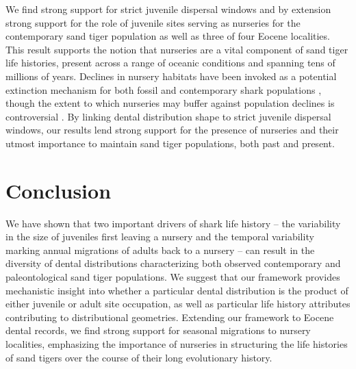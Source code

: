 \documentclass[]{rsos}%
\begin{document}
We find strong support for strict juvenile dispersal windows and by extension strong support for the role of juvenile sites serving as nurseries for the contemporary sand tiger population as well as three of four Eocene localities. %
This result supports the notion that nurseries are a vital component of sand tiger life histories, present across a range of oceanic conditions and spanning tens of millions of years.
Declines in nursery habitats have been invoked as a potential extinction mechanism for both fossil \cite{Pimiento2010} and contemporary shark populations \cite{castro1987position, heupel2007shark, heithaus2007nursery}, though the extent to which nurseries may buffer against population declines is controversial \cite{kinney2009reassessing}.
By linking dental distribution shape to strict juvenile dispersal windows, our results lend strong support for the presence of nurseries and their utmost importance to maintain sand tiger populations, both past and present.






\section{Conclusion}

We have shown that two important drivers of shark life history -- the variability in the size of juveniles first leaving a nursery and the temporal variability marking annual migrations of adults back to a nursery -- can result in the diversity of dental distributions characterizing both observed contemporary and paleontological sand tiger populations.
We suggest that our framework provides mechanistic insight into whether a particular dental distribution is the product of either juvenile or adult site occupation, as well as particular life history attributes contributing to distributional geometries.
Extending our framework to Eocene dental records, we find strong support for seasonal migrations to nursery localities, emphasizing the importance of nurseries in structuring the life histories of sand tigers over the course of their long evolutionary history.
\end{document}
